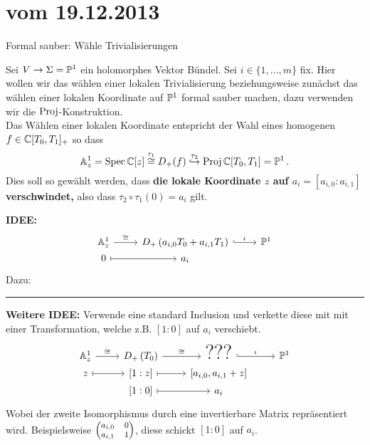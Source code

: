 \section*{vom 19.12.2013}

\begin{ex}
Formal sauber: Wähle Trivialisierungen
\end{ex}
Sei $V\to\Sigma=\P^1$ ein holomorphes Vektor Bündel.
Sei $i\in\{1,\dots,m\}$ fix.
Hier wollen wir das wählen einer lokalen Trivialisierung beziehungsweise
zunächst das wählen einer lokalen Koordinate auf $\P^1$ formal sauber machen,
dazu verwenden wir die $\Proj$-Konstruktion.\\
Das Wählen einer lokalen Koordinate entspricht der Wahl eines homogenen
$f\in\C[T_0,T_1]_+$ so dass
\[
\A_z^1=\Spec\C[z] \overset{\tau_1}\cong D_+(f)
\overset{\tau_2}\hookrightarrow
\Proj\C[T_0,T_1]=\P^1 \,.
\]
Dies soll so gewählt werden, dass \textbf{\boldmath die lokale Koordinate $z$
auf $a_i=[a_{i,0}:a_{i,1}]$ verschwindet,} also dass $\tau_2\circ\tau_1(0)=a_i$
gilt.

\textbf{IDEE:}
\[ \begin{tikzcd}[row sep=0]
\A_z^1 \rar{\cong}& D_+\left(a_{i,0}T_0 + a_{i,1}T_1\right) \rar[hook]{\iota}
  & \P^1\\
0 \arrow[|->]{r}& a_i
\end{tikzcd} \]
Dazu:
\begin{comment}
\begin{align*}
D_+\left(a_{i,0}T_0 + a_{i,1}T_1\right)
  &=\Proj \C[T_0,T_1]\Big\backslash
    V_+\Big(\left(a_{i,0}T_0 + a_{i,1}T_1\right)\Big)
\\&\hookrightarrow\P^1
    \qquad \text{~durch~} \qquad a\mapsto a
\end{align*}
\textbf{Fall:} $a=[1:0]$ dann ist $\A^1\cong D_+(T_1)\hookrightarrow \P^1$
durch $x \mapsto (1,z)$
\end{comment}

\begin{center} \rule{0.7\textwidth}{0.4pt} \end{center}

\textbf{Weitere IDEE:}
Verwende eine standard Inclusion und verkette diese mit mit einer
Transformation, welche z.B. $[1:0]$ auf $a_i$ verschiebt.
\[ \begin{tikzcd}[row sep=0]
\A_z^1 \rar{\cong}& D_+\left(T_0\right) \rar{\cong}
  &{\text{\huge???}} \rar[hook]{\iota} & \P^1\\
z \arrow[|->]{r}& {[1:z]} \rar[|->] & {[a_{i,0},a_{i,1}+z]}\\
  & {[1:0]} \arrow[|->]{r}& a_i
\end{tikzcd} \]
Wobei der zweite Isomorphismus durch eine invertierbare Matrix repräsentiert
wird. Beispielsweise $\footnotesize\begin{pmatrix}a_{i,0} & 0\\ a_{i,1} & 1
\end{pmatrix}$, diese schickt $[1:0]$ auf $a_i$.

